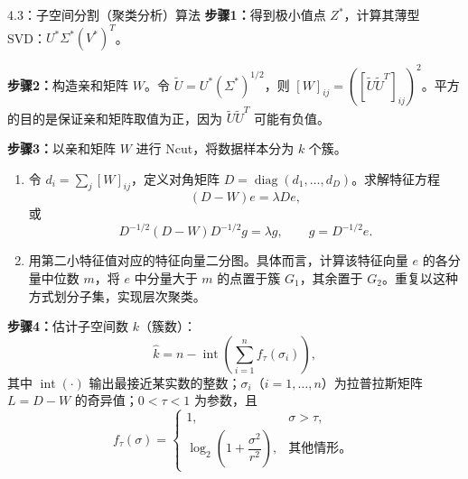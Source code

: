\begin{bookalgorithm}{4.3：子空间分割（聚类分析）算法}
\noindent\textbf{步骤1：}得到极小值点 $Z^*$，计算其薄型 SVD：$U^*\Sigma^*(V^*)^T$。

\noindent\textbf{步骤2：}构造亲和矩阵 $W$。令 $\widetilde U=U^*(\Sigma^*)^{1/2}$，则 $[W]_{ij}=([\widetilde U\widetilde U^T]_{ij})^2$。平方的目的是保证亲和矩阵取值为正，因为 $\widetilde U\widetilde U^T$ 可能有负值。

\noindent\textbf{步骤3：}以亲和矩阵 $W$ 进行 Ncut，将数据样本分为 $k$ 个簇。
\begin{enumerate}[label=\alph*.,leftmargin=2em]
\item 令 $d_i=\sum_j[W]_{ij}$，定义对角矩阵 $D=\operatorname{diag}(d_1,\ldots,d_D)$。求解特征方程
\[
(D-W)e=\lambda De,
\]
或
\[
D^{-1/2}(D-W)D^{-1/2}g=\lambda g,\qquad g=D^{-1/2}e.
\]
\item 用第二小特征值对应的特征向量二分图。具体而言，计算该特征向量 $e$ 的各分量中位数 $m$，将 $e$ 中分量大于 $m$ 的点置于簇 $G_1$，其余置于 $G_2$。重复以这种方式划分子集，实现层次聚类。
\end{enumerate}
\noindent\textbf{步骤4：}估计子空间数 $k$（簇数）：
\[
\hat k=n-\operatorname{int}\left(\sum_{i=1}^{n}f_\tau(\sigma_i)\right),
\]
其中 $\operatorname{int}(\cdot)$ 输出最接近某实数的整数；$\sigma_i$（$i=1,\ldots,n$）为拉普拉斯矩阵 $L=D-W$ 的奇异值；$0<\tau<1$ 为参数，且
\[
f_\tau(\sigma)=\begin{cases}
1,&\sigma>\tau,\\
\log_2\left(1+\dfrac{\sigma^2}{r^2}\right),&\text{其他情形。}
\end{cases}
\]
\end{bookalgorithm}
\FloatBarrier
